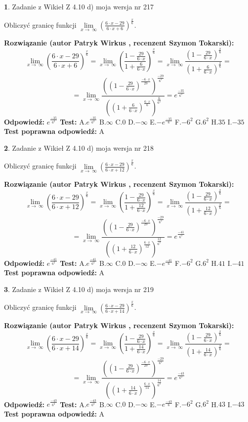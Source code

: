 \documentclass[12pt, a4paper]{article}
\theoremstyle{definition} %
\newtheorem{zad}{}
\newcommand{\zadStart}[1]{\begin{zad}#1\newline}
\newcommand{\zadStop}{\end{zad}}
\newcommand{\rozwStart}[2]{\noindent \textbf{Rozwiązanie (autor #1 , recenzent #2): }\newline}
\newcommand{\rozwStop}{\newline}
\newcommand{\odpStart}{\noindent \textbf{Odpowiedź:}\newline}
\newcommand{\odpStop}{\newline}
\newcommand{\testStart}{\noindent \textbf{Test:}\newline}
\newcommand{\testStop}{\newline}
\newcommand{\kluczStart}{\noindent \textbf{Test poprawna odpowiedź:}\newline}
\newcommand{\kluczStop}{\newline}
\begin{document}
\zadStart{Zadanie z Wikieł Z 4.10 d) moja wersja nr 217}


Obliczyć granicę funkcji  $\lim\limits_{x\to\ \infty}(\frac{6\cdot x-29}{6\cdot x+6})^{\frac{x}{6}}$.
\zadStop
\rozwStart{Patryk Wirkus}{Szymon Tokarski}
$$\lim\limits_{x\to\ \infty}(\frac{6\cdot x-29}{6\cdot x+6})^{\frac{x}{6}} = \lim\limits_{x\to\ \infty}(\frac{1-\frac{29}{6\cdot x}}{1+\frac{6}{6\cdot x}})^{\frac{x}{6}}=\lim\limits_{x\to\ \infty}\frac{(1-\frac{29}{6\cdot x})^{\frac{x}{6}}}{(1+\frac{6}{6\cdot x})^{\frac{x}{6}}}=$$
$$=\lim\limits_{x\to\ \infty}\frac{((1-\frac{29}{6\cdot x})^{\frac{-6\cdot x}{29}})^{\frac{-29}{6^{2}}}}{((1+\frac{6}{6\cdot x})^{\frac{6\cdot x}{6}})^{\frac{6}{6^{2}}}}=e^{\frac{-35}{6^{2}}}$$
\rozwStop
\odpStart
$e^{\frac{-35}{6^{2}}}$
\odpStop
\testStart
A.$e^{\frac{-35}{6^{2}}}$ B.$\infty$ C.$0$ D.$-\infty$ E.$-e^{\frac{-35}{6}}$
F.$-6^{2}$ G.$6^{2}$
H.$35$
I.$-35$
\testStop
\kluczStart
A
\kluczStop



\zadStart{Zadanie z Wikieł Z 4.10 d) moja wersja nr 218}


Obliczyć granicę funkcji  $\lim\limits_{x\to\ \infty}(\frac{6\cdot x-29}{6\cdot x+12})^{\frac{x}{6}}$.
\zadStop
\rozwStart{Patryk Wirkus}{Szymon Tokarski}
$$\lim\limits_{x\to\ \infty}(\frac{6\cdot x-29}{6\cdot x+12})^{\frac{x}{6}} = \lim\limits_{x\to\ \infty}(\frac{1-\frac{29}{6\cdot x}}{1+\frac{12}{6\cdot x}})^{\frac{x}{6}}=\lim\limits_{x\to\ \infty}\frac{(1-\frac{29}{6\cdot x})^{\frac{x}{6}}}{(1+\frac{12}{6\cdot x})^{\frac{x}{6}}}=$$
$$=\lim\limits_{x\to\ \infty}\frac{((1-\frac{29}{6\cdot x})^{\frac{-6\cdot x}{29}})^{\frac{-29}{6^{2}}}}{((1+\frac{12}{6\cdot x})^{\frac{6\cdot x}{12}})^{\frac{12}{6^{2}}}}=e^{\frac{-41}{6^{2}}}$$
\rozwStop
\odpStart
$e^{\frac{-41}{6^{2}}}$
\odpStop
\testStart
A.$e^{\frac{-41}{6^{2}}}$ B.$\infty$ C.$0$ D.$-\infty$ E.$-e^{\frac{-41}{6}}$
F.$-6^{2}$ G.$6^{2}$
H.$41$
I.$-41$
\testStop
\kluczStart
A
\kluczStop



\zadStart{Zadanie z Wikieł Z 4.10 d) moja wersja nr 219}


Obliczyć granicę funkcji  $\lim\limits_{x\to\ \infty}(\frac{6\cdot x-29}{6\cdot x+14})^{\frac{x}{6}}$.
\zadStop
\rozwStart{Patryk Wirkus}{Szymon Tokarski}
$$\lim\limits_{x\to\ \infty}(\frac{6\cdot x-29}{6\cdot x+14})^{\frac{x}{6}} = \lim\limits_{x\to\ \infty}(\frac{1-\frac{29}{6\cdot x}}{1+\frac{14}{6\cdot x}})^{\frac{x}{6}}=\lim\limits_{x\to\ \infty}\frac{(1-\frac{29}{6\cdot x})^{\frac{x}{6}}}{(1+\frac{14}{6\cdot x})^{\frac{x}{6}}}=$$
$$=\lim\limits_{x\to\ \infty}\frac{((1-\frac{29}{6\cdot x})^{\frac{-6\cdot x}{29}})^{\frac{-29}{6^{2}}}}{((1+\frac{14}{6\cdot x})^{\frac{6\cdot x}{14}})^{\frac{14}{6^{2}}}}=e^{\frac{-43}{6^{2}}}$$
\rozwStop
\odpStart
$e^{\frac{-43}{6^{2}}}$
\odpStop
\testStart
A.$e^{\frac{-43}{6^{2}}}$ B.$\infty$ C.$0$ D.$-\infty$ E.$-e^{\frac{-43}{6}}$
F.$-6^{2}$ G.$6^{2}$
H.$43$
I.$-43$
\testStop
\kluczStart
A
\kluczStop
\end{document}
